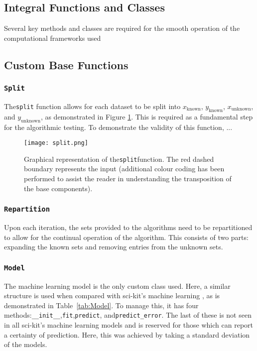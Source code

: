 \subsection{Integral Functions and Classes}
Several key methods and classes are required for the smooth operation of the computational frameworks used

\subsection{Custom Base Functions}
\subsubsection{\lstinline{Split}}
The\lstinline{split} function allows for each dataset to be split into $x_\mathrm{known}$, $y_\mathrm{known}$, $x_\mathrm{unknown}$, and $y_\mathrm{unknown}$, as demonstrated in Figure \ref{fig:Split}. This is required as a fundamental step for the algorithmic testing. To demonstrate the validity of this function, ...

    \begin{figure}
        \begin{center}
            \texttt{[image: split.png]}
        \end{center}
        \caption[Representation of the split function]{Graphical representation of the\lstinline{split}function. The red dashed boundary represents the input (additional colour coding has been performed to assist the reader in understanding the transposition of the base components).}
        \label{fig:Split}
    \end{figure}


    \subsubsection{\lstinline{Repartition}}
    Upon each iteration, the sets provided to the algorithms need to be repartitioned to allow for the continual operation of the algorithm. This consists of two parts: expanding the known sets and removing entries from the unknown sets.

    \subsubsection{\lstinline{Model}}
    The machine learning model is the only custom class used. Here, a similar structure is used when compared with sci-kit's machine learning \cite{scikit}, as is demonstrated in Table~\ref{tab:Model}. To manage this, it has four methods:\lstinline{__init__},\lstinline{fit},\lstinline{predict}, and\lstinline{predict_error}. The last of these is not seen in all sci-kit's machine learning models and is reserved for those which can report a certainty of prediction. Here, this was achieved by taking a standard deviation of the models.

